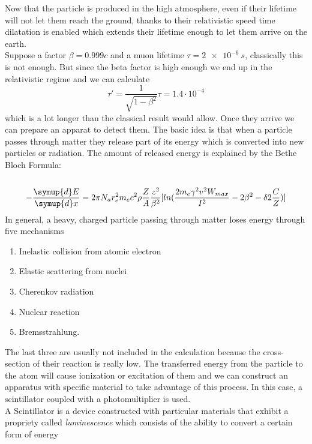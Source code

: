 Now that the particle is produced in the high atmosphere, even if their lifetime will not let
them reach the ground, thanks to their relativistic speed time dilatation is enabled which
extends their lifetime enough to let them arrive on the earth.\\
Suppose a factor $\beta = 0.999c$ and a muon lifetime $\tau = \SI{2e-6}{s}$, 
classically this is not enough. But since the beta factor is high enough we end up in
the relativistic regime and we can calculate
\begin{equation*}
\tau '  = \frac {1}{\sqrt{1- \beta ^2}} \tau = 1.4 \cdot 10^{-4}
\end{equation*}
which is a lot longer than the classical result would allow. 
Once they arrive we can prepare an apparat to detect them.
The basic idea is that when a particle passes through matter they release part of its energy which
is converted into new particles or radiation. The amount of released energy is explained by the
Bethe Bloch Formula:\\\\
\begin{equation*}
-\frac {\symup{d}E}{\symup{d}x} = 2 \pi N_a r_{e}^{2}m_{e}c^{2}\rho \frac{Z}{A} \frac {z^{2}}{\beta^{2}} [ ln(\frac{2m_{e} \gamma^{2} v^{2} W_{max}}{I^{2}}  - 2 \beta^{2} - \delta 2 \frac {C}{Z})]
\end{equation*}
In general, a heavy, charged particle passing through matter loses energy through five mechanisms
\begin{enumerate}
    \item Inelastic collision from atomic electron
    \item Elastic scattering from nuclei
    \item Cherenkov radiation
    \item Nuclear reaction
    \item Bremsstrahlung.
\end{enumerate}
The last three are usually not included in the calculation because the 
cross-section of their reaction is really low. The transferred energy from the particle 
to the atom will cause ionization or excitation of them and we can construct an apparatus
with specific material to take advantage of this process. In this case, a scintillator
coupled with a photomultiplier is used.\\
A Scintillator is a device constructed with particular materials that exhibit a propriety 
called \textit{luminescence} which consists of the ability to convert a certain form of energy
